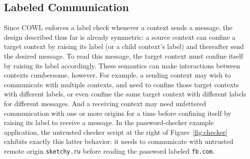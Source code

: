 \subsection{Labeled Communication}
\label{sec:system:communication}
Since COWL enforces a label check whenever a context sends a message,
the design described thus far is already symmetric: a source context
can confine a target context by raising its label (or a child
context's label) and thereafter send the desired message. To read this
message, the target context must confine itself by raising its label
accordingly. These semantics can make interactions between contexts
cumbersome, however. For example, a sending context may wish to
communicate with multiple contexts, and need to confine those
target contexts with different labels, or even confine the same target
context with different labels for different messages. And a receiving
context may need unfettered communication with one or more origins for
a time before confining itself by raising its label to receive a
message. In the password-checker example application, the untrusted
checker script at the right of Figure~\ref{fig:checker} exhibits
exactly this latter behavior: it needs to communicate with untrusted
remote origin {\tt sketchy.ru} before reading the password labeled
{\tt fb.com}.


